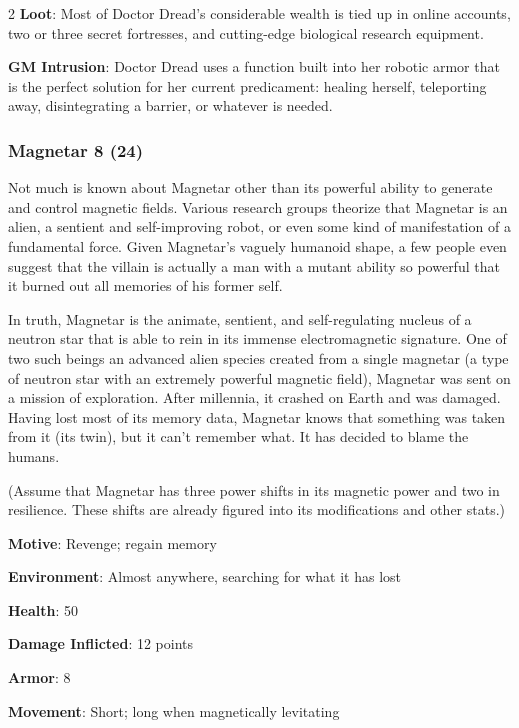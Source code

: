 \begin{multicols}{2}
\textbf{Loot}: Most of Doctor Dread’s considerable wealth is tied up in online accounts, two or three secret fortresses, and cutting-edge biological research equipment.

\textbf{GM Intrusion}: Doctor Dread uses a function built into her robotic armor that is the perfect solution for her current predicament: healing herself, teleporting away, disintegrating a barrier, or whatever is needed.

\subsubsection{Magnetar	8 (24)}

Not much is known about Magnetar other than its powerful ability to generate and control magnetic fields. Various research groups theorize that Magnetar is an alien, a sentient and self-improving robot, or even some kind of manifestation of a fundamental force. Given Magnetar’s vaguely humanoid shape, a few people even suggest that the villain is actually a man with a mutant ability so powerful that it burned out all memories of his former self.

In truth, Magnetar is the animate, sentient, and self-regulating nucleus of a neutron star that is able to rein in its immense electromagnetic signature. One of two such beings an advanced alien species created from a single magnetar (a type of neutron star with an extremely powerful magnetic field), Magnetar was sent on a mission of exploration. After millennia, it crashed on Earth and was damaged. Having lost most of its memory data, Magnetar knows that something was taken from it (its twin), but it can’t remember what. It has decided to blame the humans.

(Assume that Magnetar has three power shifts in its magnetic power and two in resilience. These shifts are already figured into its modifications and other stats.)

\textbf{Motive}: Revenge; regain memory

\textbf{Environment}: Almost anywhere, searching for what it has lost

\textbf{Health}: 50

\textbf{Damage Inflicted}: 12 points

\textbf{Armor}: 8

\textbf{Movement}: Short; long when magnetically levitating


\end{multicols}
